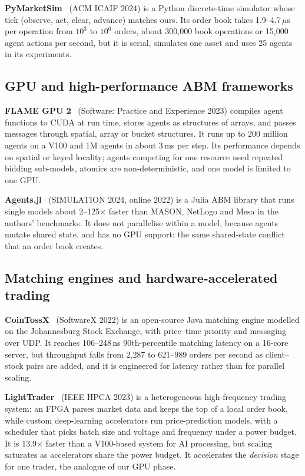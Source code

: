 \textbf{PyMarketSim}~\cite{mascioli2024} (ACM ICAIF 2024) is a Python discrete-time simulator whose
tick (observe, act, clear, advance) matches ours. Its order book takes 1.9--4.7\,$\mu$s per
operation from $10^3$ to $10^6$ orders, about 300{,}000 book operations or 15{,}000 agent actions
per second, but it is serial, simulates one asset and uses 25 agents in its experiments.

\subsection{GPU and high-performance ABM frameworks}
\textbf{FLAME GPU 2}~\cite{richmond2023} (Software: Practice and Experience 2023) compiles agent
functions to CUDA at run time, stores agents as structures of arrays, and passes messages through
spatial, array or bucket structures. It runs up to 200 million agents on a V100 and 1M agents in
about 3\,ms per step. Its performance depends on spatial or keyed locality; agents competing for
one resource need repeated bidding sub-models, atomics are non-deterministic, and one model is
limited to one GPU.

\textbf{Agents.jl}~\cite{datseris2024} (SIMULATION 2024, online 2022) is a Julia ABM library that
runs single models about 2--125$\times$ faster than MASON, NetLogo and Mesa in the authors'
benchmarks. It does not parallelise within a model, because agents mutate shared state, and has no
GPU support: the same shared-state conflict that an order book creates.

\subsection{Matching engines and hardware-accelerated trading}
\textbf{CoinTossX}~\cite{jericevich2022} (SoftwareX 2022) is an open-source Java matching engine
modelled on the Johannesburg Stock Exchange, with price--time priority and messaging over UDP. It
reaches 106--248\,ns 90th-percentile matching latency on a 16-core server, but throughput falls from
2{,}287 to 621--989 orders per second as client--stock pairs are added, and it is engineered for
latency rather than for parallel scaling.

\textbf{LightTrader}~\cite{yoo2023} (IEEE HPCA 2023) is a heterogeneous high-frequency trading system:
an FPGA parses market data and keeps the top of a local order book, while custom deep-learning
accelerators run price-prediction models, with a scheduler that picks batch size and voltage and
frequency under a power budget. It is 13.9$\times$ faster than a V100-based system for AI
processing, but scaling saturates as accelerators share the power budget. It accelerates the
\emph{decision} stage for one trader, the analogue of our GPU phase.

